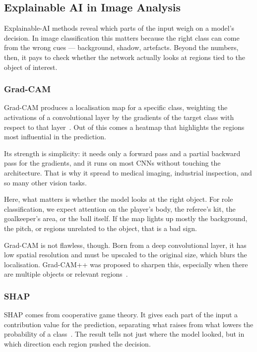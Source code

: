 \documentclass[preprint,12pt]{elsarticle}
\begin{document}
\subsection{Explainable AI in Image Analysis}

Explainable-AI methods reveal which parts of the input weigh on a model's decision. In image classification this matters because the right class can come from the wrong cues --- background, shadow, artefacts. Beyond the numbers, then, it pays to check whether the network actually looks at regions tied to the object of interest.

\subsubsection{Grad-CAM}

Grad-CAM produces a localisation map for a specific class, weighting the activations of a convolutional layer by the gradients of the target class with respect to that layer~\cite{selvaraju2020gradcam}. Out of this comes a heatmap that highlights the regions most influential in the prediction.

Its strength is simplicity: it needs only a forward pass and a partial backward pass for the gradients, and it runs on most CNNs without touching the architecture. That is why it spread to medical imaging, industrial inspection, and so many other vision tasks.

Here, what matters is whether the model looks at the right object. For role classification, we expect attention on the player's body, the referee's kit, the goalkeeper's area, or the ball itself. If the map lights up mostly the background, the pitch, or regions unrelated to the object, that is a bad sign.

Grad-CAM is not flawless, though. Born from a deep convolutional layer, it has low spatial resolution and must be upscaled to the original size, which blurs the localisation. Grad-CAM++ was proposed to sharpen this, especially when there are multiple objects or relevant regions~\cite{chattopadhay2018gradcampp}.

\subsubsection{SHAP}

SHAP comes from cooperative game theory. It gives each part of the input a contribution value for the prediction, separating what raises from what lowers the probability of a class~\cite{lundberg2017unified}. The result tells not just where the model looked, but in which direction each region pushed the decision.
\end{document}
